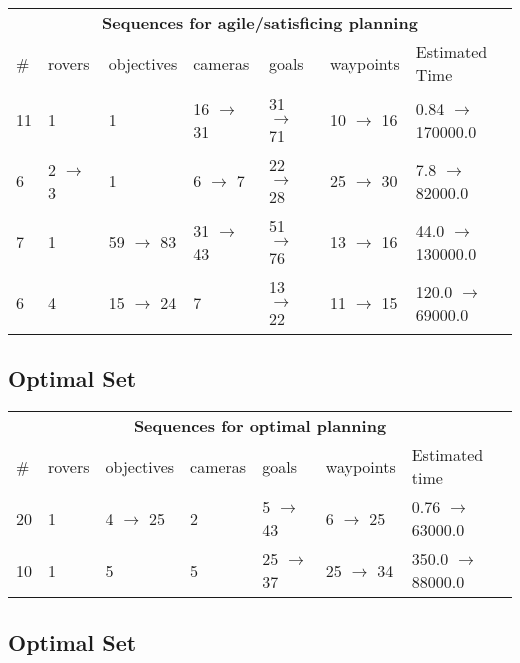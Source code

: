 \documentclass{article}
\begin{document}
                        \begin{center}
                        \begin{tabular}{l|l|l|l|l|l|l}
                        \multicolumn{7}{c}{\bf \large Sequences for agile/satisficing planning}\\
                        \# & rovers & objectives & cameras & goals & waypoints & Estimated Time\\\midrule
                        11&1&1&16 $\rightarrow$ 31&31 $\rightarrow$ 71&10 $\rightarrow$ 16&0.84 $\rightarrow$ 170000.0\\
6&2 $\rightarrow$ 3&1&6 $\rightarrow$ 7&22 $\rightarrow$ 28&25 $\rightarrow$ 30&7.8 $\rightarrow$ 82000.0\\
7&1&59 $\rightarrow$ 83&31 $\rightarrow$ 43&51 $\rightarrow$ 76&13 $\rightarrow$ 16&44.0 $\rightarrow$ 130000.0\\
6&4&15 $\rightarrow$ 24&7&13 $\rightarrow$ 22&11 $\rightarrow$ 15&120.0 $\rightarrow$ 69000.0
                        \end{tabular}
                        \end{center}
                    
                            \subsection*{Optimal Set}

                            \begin{center}
                            \begin{tabular}{l|l|l|l|l|l|l}
                            \multicolumn{7}{c}{\bf \large Sequences for optimal planning}\\
                            \# & rovers & objectives & cameras & goals & waypoints & Estimated time\\\midrule
                            20&1&4 $\rightarrow$ 25&2&5 $\rightarrow$ 43&6 $\rightarrow$ 25&0.76 $\rightarrow$ 63000.0\\
10&1&5&5&25 $\rightarrow$ 37&25 $\rightarrow$ 34&350.0 $\rightarrow$ 88000.0
                            \end{tabular}
                            \end{center}
                    
                                \subsection*{Optimal Set}
                                
\end{document}
